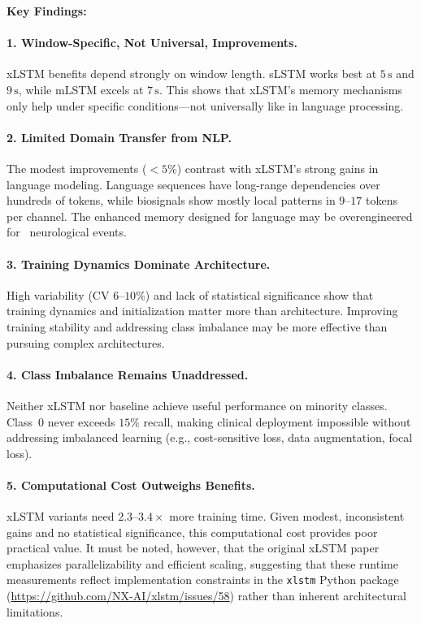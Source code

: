 \textbf{Key Findings:}

\paragraph{1. Window-Specific, Not Universal, Improvements.}
\ac{xLSTM} benefits depend strongly on window length. \ac{sLSTM} works best at $5\,\text{s}$ and $9\,\text{s}$, while \ac{mLSTM} excels at $7\,\text{s}$. This shows that \ac{xLSTM}'s memory mechanisms only help under specific conditions---not universally like in language processing.

\paragraph{2. Limited Domain Transfer from NLP.}
The modest improvements ($<5\%$) contrast with \ac{xLSTM}'s strong gains in language modeling. Language sequences have long-range dependencies over hundreds of tokens, while biosignals show mostly local patterns in $9$--$17$ tokens per channel. The enhanced memory designed for language may be overengineered for \ neurological events.

\paragraph{3. Training Dynamics Dominate Architecture.}
High variability (CV $6$--$10\%$) and lack of statistical significance show that training dynamics and initialization matter more than architecture. Improving training stability and addressing class imbalance may be more effective than pursuing complex architectures.

\paragraph{4. Class Imbalance Remains Unaddressed.}
Neither \ac{xLSTM} nor baseline achieve useful performance on minority classes. Class~0 never exceeds $15\%$ recall, making clinical deployment impossible without addressing imbalanced learning (e.g., cost-sensitive loss, data augmentation, focal loss).

\paragraph{5. Computational Cost Outweighs Benefits.}
\ac{xLSTM} variants need $2.3$--$3.4\times$ more training time. Given modest, inconsistent gains and no statistical significance, this computational cost provides poor practical value. It must be noted, however, that the original \ac{xLSTM} paper~\cite{beck2024xlstm} emphasizes parallelizability and efficient scaling, suggesting that these runtime measurements reflect implementation constraints in the \texttt{xlstm} Python package (\url{https://github.com/NX-AI/xlstm/issues/58}) rather than inherent architectural limitations.

